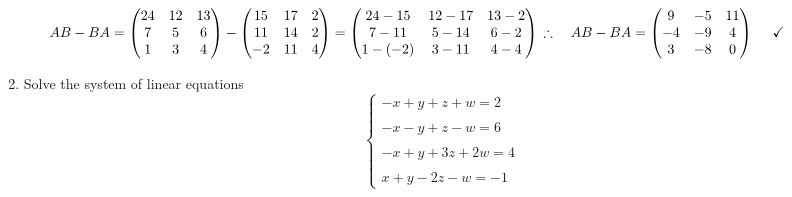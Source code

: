 \documentclass[fleqn]{article}
\begin{document}
\begin{enumerate}
\begin{itemize}
          \textcolor{hwColor}{
            $
              AB-BA=\begin{pmatrix}
                24 & 12 & 13 
                \\
                7 & 5 & 6 
                \\
                1 & 3 & 4
              \end{pmatrix}-\begin{pmatrix}
                15 & 17 & 2
                \\
                11 & 14 & 2
                \\
                -2 & 11 & 4
              \end{pmatrix}=\begin{pmatrix}
                24-15 & 12-17 & 13-2 
                \\
                7-11 & 5-14 & 6-2 
                \\
                1-(-2) & 3-11 & 4-4 
              \end{pmatrix}
              \\
              \\
              \\
              \therefore ~~~ AB-BA=\begin{pmatrix}
                9 & -5 & 11
                \\
                -4 & -9 & 4 
                \\
                3 & -8 & 0 
              \end{pmatrix} ~~~~ \checkmark
            $
          }

      \end{itemize}
    
    \item Solve the system of linear equations
      $$
        \begin{cases}
          -x+y+z+w=2 \\
          \\
          -x-y+z-w=6 \\
          \\
          -x+y+3z+2w=4 \\
          \\
          x+y-2z-w=-1
        \end{cases}
      $$


\end{enumerate}
\end{document}
